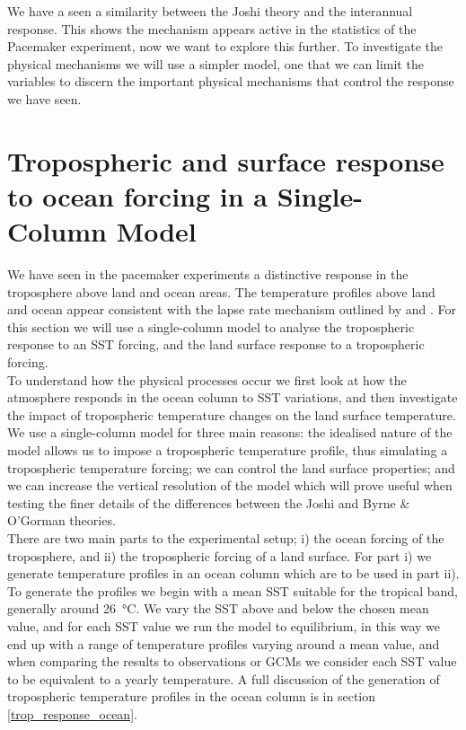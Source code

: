 We have a seen a similarity between the Joshi theory and the interannual 
response. This shows the mechanism appears active in the statistics of the 
Pacemaker experiment, now we want to explore this further. To investigate the 
physical mechanisms we will use a simpler model, one that we can limit the 
variables to discern the important physical mechanisms that control the response 
we have seen.

\section{Tropospheric and surface response to ocean forcing in a Single-Column 
Model}
\label{mech_scm}


We have seen in the pacemaker experiments a distinctive response in the 
troposphere above land and ocean areas. The temperature profiles above land and 
ocean appear consistent with the lapse rate mechanism outlined by 
\citet{Joshi2007} and \citet{Byrne2013}. For this section we will use a 
single-column model to analyse the tropospheric response to an SST forcing, and 
the land surface response to a tropospheric forcing.\\
To understand how the physical processes occur we first look at how the 
atmosphere responds in the ocean column to SST variations, and then investigate 
the impact of tropospheric temperature changes on the land surface 
temperature.\\
We use a single-column model for three main reasons: the idealised nature of the 
model allows us to impose a tropospheric temperature profile, thus simulating a 
tropospheric temperature forcing; we can control the land surface properties; 
and we can increase the vertical resolution of the model which will prove useful 
when testing the finer details of the differences between the Joshi and Byrne \& 
O'Gorman theories.\\


There are two main parts to the experimental setup; i) the ocean forcing of the 
troposphere, and ii) the tropospheric forcing of a land surface. For part i) we	 
generate temperature profiles in an ocean column which are to be used in part 
ii). To generate the profiles we begin with a mean SST suitable for the tropical 
band, generally around \SI{26}{\degreeCelsius}. We vary the SST above and below 
the chosen mean value, and for each SST value we run the model to equilibrium, 
in this way we end up with a range of temperature profiles varying around a mean 
value, and when comparing the results to observations or GCMs we consider each 
SST value to be equivalent to a yearly temperature. A full discussion of the 
generation of tropospheric temperature profiles in the ocean column is in 
section \ref{trop_response_ocean}.


